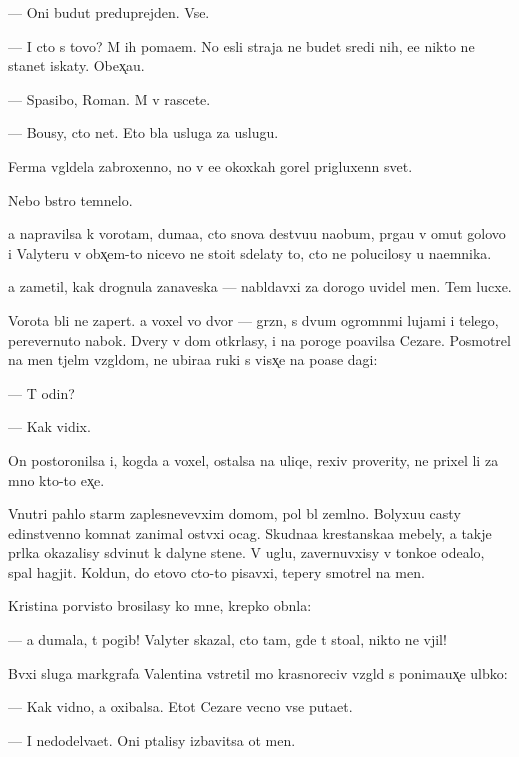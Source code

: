\documentclass[10pt]{book}
\begin{document}
— Oni budut preduprejden{\yi}. Vse.

— I cto s tovo? M{\yi} ih po{\y}ma{\y}em. No {\y}esli straja ne budet sredi nih, {\y}e{\y}e nikto ne stanet iskaty. Obex̨a{\y}u.

— Spasibo, Roman. M{\yi} v rascete.

— Bo{\y}usy, cto net. Eto b{\yi}la usluga za uslugu.



Ferma v{\yi}gl{\ia}dela zabroxenno{\y}, no v {\y}e{\y}e okoxkah gorel prigluxenn{\yi}{\y} svet.

Nebo b{\yi}stro temnelo.

{\Y}a napravilsa k vorotam, duma{\y}a, cto snova de{\y}stvu{\y}u naobum, pr{\yi}ga{\y}u v omut golovo{\y} i Valyteru v obx̨em-to nicevo ne sto{\y}it sdelaty to, cto ne polucilosy u na{\y}emnika.

{\Y}a zametil, kak drognula zanaveska — nabl{\iu}davxi{\y} za dorogo{\y} uvidel men{\ia}. Tem lucxe.

Vorota b{\yi}li ne zapert{\yi}. {\Y}a voxel vo dvor — gr{\ia}zn{\yi}{\y}, s dvum{\ia} ogromn{\yi}mi lujami i telego{\y}, perevernuto{\y} nabok. Dvery v dom otkr{\yi}lasy, i na poroge po{\y}avilsa Cezare. Posmotrel na men{\ia} t{\ia}jel{\yi}m vzgl{\ia}dom, ne ubira{\y}a ruki s vis{\ia}x̨e{\y} na po{\y}ase dagi:

— T{\yi} odin?

— Kak vidix.

On postoronilsa i, kogda {\y}a voxel, ostalsa na uliqe, rexiv proverity, ne prixel li za mno{\y} kto-to {\y}ex̨e.

Vnutri pahlo star{\yi}m zaplesnevevxim domom, pol b{\yi}l zeml{\ia}no{\y}. Bolyxu{\y}u casty {\y}edinstvenno{\y} komnat{\yi} zanimal ost{\yi}vxi{\y} ocag. Skudna{\y}a krest{\y}anska{\y}a mebely, a takje pr{\ia}lka okazalisy sdvinut{\yi} k dalyne{\y} stene. V uglu, zavernuvxisy v tonko{\y}e ode{\y}alo, spal hagjit. Koldun, do etovo cto-to pisavxi{\y}, tepery smotrel na men{\ia}.

Kristina por{\yi}visto brosilasy ko mne, krepko obn{\ia}la:

— {\Y}a dumala, t{\yi} pogib! Valyter skazal, cto tam, gde t{\yi} sto{\y}al, nikto ne v{\yi}jil!

B{\yi}vxi{\y} sluga markgrafa Valentina vstretil mo{\y} krasnoreciv{\yi}{\y} vzgl{\ia}d s ponima{\y}ux̨e{\y} ul{\yi}bko{\y}:

— Kak vidno, {\y}a oxibalsa. Etot Cezare vecno vse puta{\y}et.

— I nedodel{\yi}va{\y}et. Oni p{\yi}talisy izbavitsa ot men{\ia}.
\end{document}
